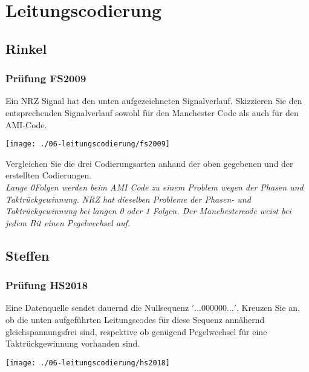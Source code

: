 

\section{Leitungscodierung}
\subsection{Rinkel}
\subsubsection{Prüfung FS2009}
Ein NRZ Signal hat den unten aufgezeichneten Signalverlauf. Skizzieren Sie den entsprechenden Signalverlauf sowohl für den Manchester Code als auch für den AMI-Code.
\begin{center}
    \vspace{-8pt}
    \texttt{[image: ./06-leitungscodierung/fs2009]}
    \vspace{-8pt}
\end{center}

Vergleichen Sie die drei Codierungsarten anhand der oben gegebenen und der erstellten Codierungen.\\
\textit{Lange 0Folgen werden beim AMI Code zu einem Problem wegen der Phasen und Taktrückgewinnung. NRZ hat dieselben Probleme der Phasen- und Taktrückgewinnung bei
langen 0 oder 1 Folgen. Der Manchestercode weist bei jedem Bit einen Pegelwechsel auf.}

\subsection{Steffen}
\subsubsection{Prüfung HS2018}
Eine Datenquelle sendet dauernd die Nullsequenz $'... 0 0 0 0 0 0 ...'$. Kreuzen Sie an, ob die unten aufgeführten Leitungscodes für diese Sequenz annähernd gleichspannungsfrei sind, respektive ob genügend Pegelwechsel für eine Taktrückgewinnung vorhanden sind.
\begin{center}
    \vspace{-8pt}
    \texttt{[image: ./06-leitungscodierung/hs2018]}
    \vspace{-8pt}
\end{center}

